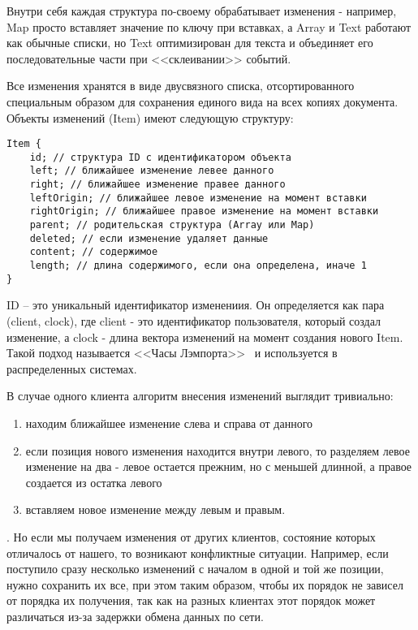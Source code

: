 \documentclass[a4paper,12pt]{article}
\begin{document}
    Внутри себя каждая структура по-своему обрабатывает изменения - например, Map просто вставляет значение по ключу при вставках, а Array и Text работают как обычные списки, но Text оптимизирован для текста и объединяет его последовательные части при <<склеивании>> событий.

    Все изменения хранятся в виде двусвязного списка, отсортированного специальным образом для сохранения единого вида на всех копиях документа. Объекты изменений (Item) имеют следующую структуру:
    \begin{verbatim}
Item {
    id; // структура ID с идентификатором объекта
    left; // ближайшее изменение левее данного
    right; // ближайшее изменение правее данного
    leftOrigin; // ближайшее левое изменение на момент вставки
    rightOrigin; // ближайшее правое изменение на момент вставки
    parent; // родительская структура (Array или Map)
    deleted; // если изменение удаляет данные
    content; // содержимое
    length; // длина содержимого, если она определена, иначе 1
}
    \end{verbatim}

    ID -- это уникальный идентификатор изменениия. Он определяется как пара (client, clock), где client - это идентификатор пользователя, который создал изменение, а clock - длина вектора изменений на момент создания нового Item. Такой подход называется <<Часы Лэмпорта>>~\cite{Lamport} и используется в распределенных системах.

    В случае одного клиента алгоритм внесения изменений выглядит тривиально:
    \begin{enumerate}
        \item находим ближайшее изменение слева и справа от данного
        \item если позиция нового изменения находится внутри левого, то разделяем левое изменение на два - левое остается прежним, но с меньшей длинной, а правое создается из остатка левого
        \item вставляем новое изменение между левым и правым.
    \end{enumerate}.
    Но если мы получаем изменения от других клиентов, состояние которых отличалось от нашего, то возникают конфликтные ситуации. Например, если поступило сразу несколько изменений с началом в одной и той же позиции, нужно сохранить их все, при этом таким образом, чтобы их порядок не зависел от порядка их получения, так как на разных клиентах этот порядок может различаться из-за задержки обмена данных по сети.
\end{document}
